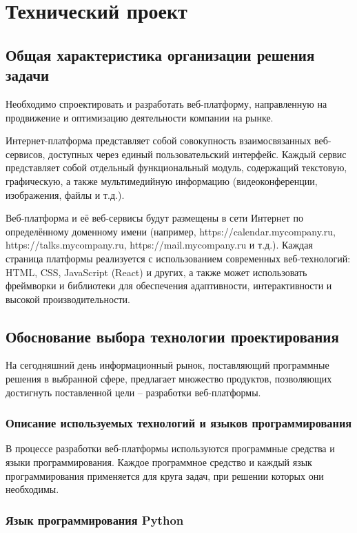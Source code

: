 \section{Технический проект}
\subsection{Общая характеристика организации решения задачи}

Необходимо спроектировать и разработать веб-платформу, направленную на продвижение и оптимизацию деятельности компании на рынке.

Интернет-платформа представляет собой совокупность взаимосвязанных веб-сервисов, доступных через единый пользовательский интерфейс. Каждый сервис представляет собой отдельный функциональный модуль, содержащий текстовую, графическую, а также мультимедийную информацию (видеоконференции, изображения, файлы и т.д.).

Веб-платформа и её веб-сервисы будут размещены в сети Интернет по определённому доменному имени (например, https://calendar.mycompany.ru, https://talks.mycompany.ru, https://mail.mycompany.ru и т.д.). Каждая страница платформы реализуется с использованием современных веб-технологий: HTML, CSS, JavaScript (React) и других, а также может использовать фреймворки и библиотеки для обеспечения адаптивности, интерактивности и высокой производительности.

\subsection{Обоснование выбора технологии проектирования}

На сегодняшний день информационный рынок, поставляющий программные решения в выбранной сфере, предлагает множество продуктов, позволяющих достигнуть поставленной цели – разработки веб-платформы.

\subsubsection{Описание используемых технологий и языков программирования}

В процессе разработки веб-платформы используются программные средства и языки программирования. Каждое программное средство и каждый язык программирования применяется для круга задач, при решении которых они необходимы.

\subsubsection{Язык программирования Python}

